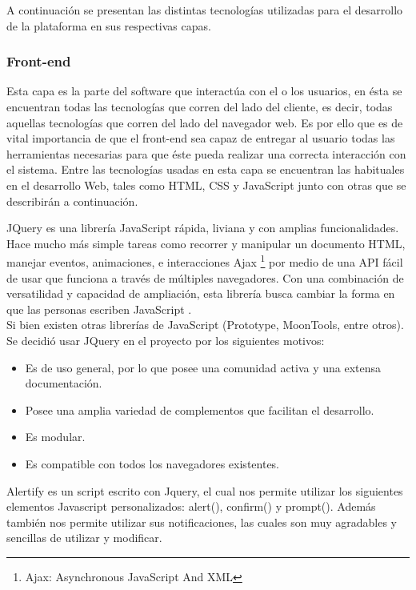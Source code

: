 A continuación se presentan las distintas tecnologías utilizadas para el desarrollo de la plataforma en sus respectivas capas.
\subsubsection{Front-end}

Esta capa es la parte del software que interactúa con el o los usuarios, en ésta  se encuentran todas las tecnologías que corren del lado del cliente, es decir, todas aquellas tecnologías que corren del lado del navegador web. Es por ello que es de vital importancia de que el front-end sea capaz de entregar  al usuario todas las herramientas necesarias para que éste pueda realizar una correcta interacción con el sistema. Entre las tecnologías usadas en esta capa se encuentran las habituales en el desarrollo Web, tales como HTML, CSS y JavaScript junto con otras que se describirán a continuación.


JQuery es una librería JavaScript rápida, liviana y con amplias funcionalidades. Hace mucho más simple tareas como recorrer y manipular un documento HTML, manejar eventos, animaciones, e interacciones Ajax	\footnote{Ajax: Asynchronous JavaScript And XML} por medio de una API fácil de usar que funciona a través de múltiples navegadores. Con una combinación de versatilidad y capacidad de ampliación, esta librería busca cambiar la forma en que las personas escriben JavaScript \cite{JQu15}.
\\

Si bien existen otras librerías de JavaScript (Prototype, MoonTools, entre otros). Se decidió usar JQuery en el proyecto por los siguientes motivos:
\begin{itemize}
	\item Es de uso general, por lo que posee una comunidad activa y una extensa documentación.
	\item Posee una amplia variedad de complementos que facilitan el desarrollo.
	\item Es modular.
	\item Es compatible con todos los navegadores existentes.
\end{itemize}



Alertify es un script escrito con Jquery, el cual nos permite utilizar los siguientes elementos Javascript personalizados: alert(), confirm() y prompt(). Además también nos permite utilizar sus notificaciones, las cuales son muy agradables y sencillas de utilizar y modificar\cite{ALE15}.
\\

